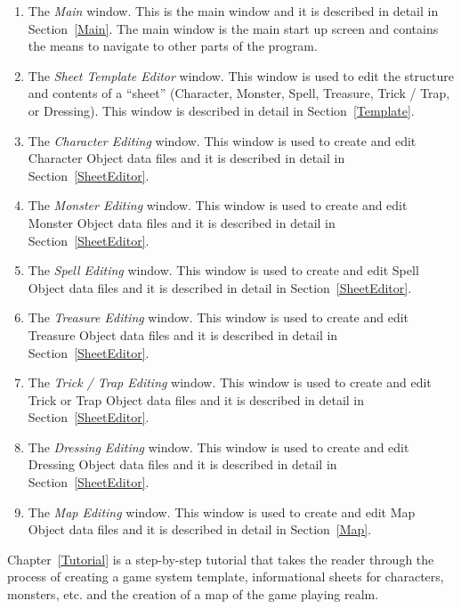 \begin{enumerate}

\item The {\em Main} window.  This is the main window and it is
described in detail in Section~\ref{Main}.  The main window is the main
start up screen and contains the means to navigate to other parts of the
program.

\item The {\em Sheet Template Editor} window.  This window is used to
edit the structure and contents of a ``sheet'' (Character, Monster,
Spell, Treasure, Trick / Trap, or Dressing).  This window is described
in detail in Section~\ref{Template}.

\item The {\em Character Editing} window.  This window is used to create
and edit Character Object data files and it is described in detail in
Section~\ref{SheetEditor}. 

\item The {\em Monster Editing} window.  This window is used to create
and edit Monster Object data files and it is described in detail in
Section~\ref{SheetEditor}. 

\item The {\em Spell Editing} window.  This window is used to create
and edit Spell Object data files and it is described in detail in
Section~\ref{SheetEditor}. 

\item The {\em Treasure Editing} window.  This window is used to create
and edit Treasure Object data files and it is described in detail in
Section~\ref{SheetEditor}. 

\item The {\em Trick / Trap Editing} window.  This window is used to create
and edit Trick or Trap Object data files and it is described in detail in
Section~\ref{SheetEditor}. 

\item The {\em Dressing Editing} window.  This window is used to create
and edit Dressing Object data files and it is described in detail in
Section~\ref{SheetEditor}. 

\item The {\em Map Editing} window.  This window is used to create
and edit Map Object data files and it is described in detail in
Section~\ref{Map}. 

\end{enumerate}


Chapter~\ref{Tutorial} is a step-by-step tutorial that takes the reader
through the process of creating a game system template, informational
sheets for characters, monsters, etc. and the creation of a map of the
game playing realm.
